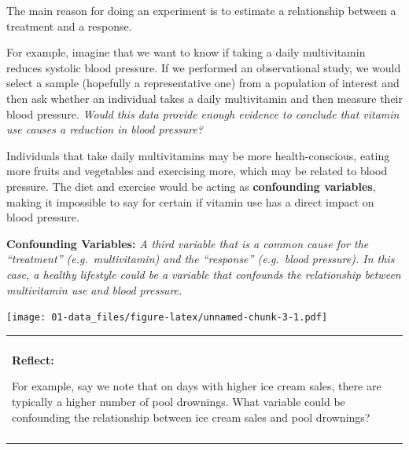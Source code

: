 \documentclass[
]{book}
\newenvironment{Shaded}{\begin{snugshade}}{\end{snugshade}}
\newcommand{\CharTok}[1]{\textcolor[rgb]{0.31,0.60,0.02}{#1}}
\newcommand{\DataTypeTok}[1]{\textcolor[rgb]{0.13,0.29,0.53}{#1}}
\newcommand{\KeywordTok}[1]{\textcolor[rgb]{0.13,0.29,0.53}{\textbf{#1}}}
\newcommand{\NormalTok}[1]{#1}
\newcommand{\OperatorTok}[1]{\textcolor[rgb]{0.81,0.36,0.00}{\textbf{#1}}}
\newcommand{\OtherTok}[1]{\textcolor[rgb]{0.56,0.35,0.01}{#1}}
\newcommand{\StringTok}[1]{\textcolor[rgb]{0.31,0.60,0.02}{#1}}
\newenvironment{reflect}
{
    \begin{center}
    
    \begin{tabular}{|p{0.8\textwidth}|}
    \rowcolor{LightBlue}
    \hline\\
    \rowcolor{LightBlue}
    \textbf{Reflect:}
}
{
    \\\rowcolor{LightBlue}
    \\\hline
    \end{tabular} 
    \end{center}
}
\begin{document}
The main reason for doing an experiment is to estimate a relationship between a treatment and a response.

For example, imagine that we want to know if taking a daily multivitamin reduces systolic blood pressure. If we performed an observational study, we would select a sample (hopefully a representative one) from a population of interest and then ask whether an individual takes a daily multivitamin and then measure their blood pressure. \emph{Would this data provide enough evidence to conclude that vitamin use causes a reduction in blood pressure?}

Individuals that take daily multivitamins may be more health-conscious, eating more fruits and vegetables and exercising more, which may be related to blood pressure. The diet and exercise would be acting as \textbf{confounding variables}, making it impossible to say for certain if vitamin use has a direct impact on blood pressure.

\textbf{Confounding Variables:} \emph{A third variable that is a common cause for the ``treatment'' (e.g.~multivitamin) and the ``response'' (e.g.~blood pressure). In this case, a healthy lifestyle could be a variable that confounds the relationship between multivitamin use and blood pressure.}

\begin{Shaded}
\end{Shaded}

\texttt{[image: 01-data\_files/figure-latex/unnamed-chunk-3-1.pdf]}

\begin{reflect}
For example, say we note that on days with higher ice cream sales, there
are typically a higher number of pool drownings. What variable could be
confounding the relationship between ice cream sales and pool drownings?
\end{reflect}
\end{document}
